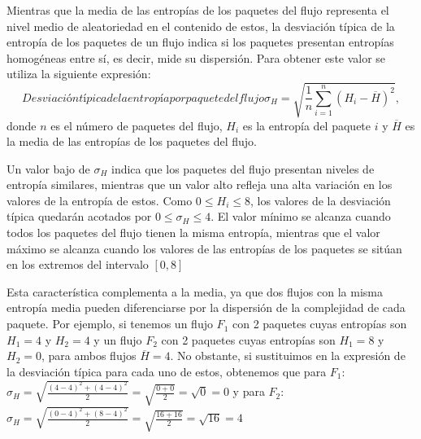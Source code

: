 Mientras que la media de las entropías de los paquetes del flujo representa el nivel medio de aleatoriedad en el contenido de estos, la desviación típica de la entropía de los paquetes de un flujo indica si los paquetes presentan entropías homogéneas entre sí, es decir, mide su dispersión. Para obtener este valor se utiliza la siguiente expresión:
\begin{equation}[eq:desviacion-entropia-paquete-flujo]{Desviación típica de la entropía por paquete del flujo}
\sigma_H = \sqrt{\frac{1}{n}\sum_{i=1}^{n}\left(H_i - \overline{H}\right)^2},
\end{equation}donde $n$ es el número de paquetes del flujo, $H_i$ es la entropía del paquete $i$ y $\overline{H}$ es la media de las entropías de los paquetes del flujo.

Un valor bajo de $\sigma_H$ indica que los paquetes del flujo presentan niveles de entropía similares, mientras que un valor alto refleja una alta variación en los valores de la entropía de estos. Como $0 \leq H_i \leq 8$, los valores de la desviación típica quedarán acotados por $0 \leq \sigma_H \leq 4$. El valor mínimo se alcanza cuando todos los paquetes del flujo tienen la misma entropía, mientras que el valor máximo se alcanza cuando los valores de las entropías de los paquetes se sitúan en los extremos del intervalo $[0,8]$

Esta característica complementa a la media, ya que dos flujos con la misma entropía media pueden diferenciarse por la dispersión de la complejidad de cada paquete. Por ejemplo, si tenemos un flujo $F_1$ con 2 paquetes cuyas entropías son $H_1 = 4$ y $H_2 = 4$ y un flujo $F_2$ con 2 paquetes cuyas entropías son $H_1 = 8$ y $H_2 = 0$, para ambos flujos $\overline{H} = 4$. No obstante, si sustituimos en la expresión de la desviación típica para cada uno de estos, obtenemos que para $F_1$: $\sigma_H = \sqrt{\frac{(4-4)^2 + (4-4)^2}{2}} = \sqrt{\frac{0+0}{2}} = \sqrt{0} = 0$ y para $F_2$: $\sigma_H = \sqrt{\frac{(0-4)^2 + (8-4)^2}{2}} = \sqrt{\frac{16+16}{2}} = \sqrt{16} = 4$